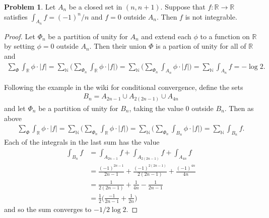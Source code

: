 \documentclass[20pt]{article}
\theoremstyle{plain}
\theoremstyle{definition}
\newtheorem*{problem}{Problem}
\newcommand{\reals}{\mathbb{R}}
\newcommand{\naturals}{\mathbb{N}}
\begin{document}
\begin{problem}{3.38}
  Let $A_n$ be a closed set in $(n, n+1)$. Suppose that $f: \reals \to \reals$
  satisfies $\int_{A_n}f = (-1)^n/n$ and $f=0$ outside $A_n.$ 
  Then $f$ is not integrable.
\end{problem}

\begin{proof}
  Let $\Phi_n$ be a partition of unity for $A_n$ and extend each 
  $\phi$ to a function on $\mathbb{R}$ by setting $\phi=0$ outside 
  $A_n$.
  Then their union $\Phi$ is a partion of unity for all of $\mathbb{R}$
  and 
  \begin{align}
    \sum_\Phi \int_\mathbb{R} \phi \cdot |f| = 
    \sum_\naturals \bigg( \sum_{\Phi_n} \int_\reals \phi \cdot |f| \bigg) = 
    \sum_\naturals \bigg( \sum_{\Phi_n} \int_{A_n} \phi \cdot |f| \bigg) = 
    \sum_\naturals \int_{A_n}f = -\log 2.
  \end{align}

  Following the example in the wiki for conditional convergence, 
  define the sets 
  \begin{align}
    B_n = A_{2n - 1} \cup A_{2(2n-1)} \cup A_{4n}
  \end{align}
  and let $\Phi_n$ be a partition of unity for $B_n$, taking the 
  value $0$ outside $B_n$.  Then as above
  \begin{align}
    \sum_\Phi \int_\reals \phi \cdot |f| = 
    \sum_\naturals \bigg(\sum_{\Phi_n} \int_\reals \phi \cdot |f| \bigg) = 
    \sum_\naturals \bigg(\sum_{\Phi_n} \int_{B_n} \phi \cdot |f| \bigg) = 
    \sum_\naturals \int_{B_n}f.
  \end{align} 
  Each of the integrals in the last sum has the value 
  \begin{align}
    \int_{B_n}f
    &= \int_{A_{2n-1}}f + \int_{A_{2(2n-1)}}f + \int_{A_{4n}}f \\
    &=  \frac{(-1)^{2n-1}}{2n-1} + 
        \frac{(-1)^{2(2n-1)}}{2(2n-1)} + 
        \frac{(-1)^{4n}}{4n} \\
    &=  \frac{1}{2(2n-1)} +
        \frac{1}{4n} -
        \frac{1}{2n-1} \\
    &= \frac{1}{2} \bigg(
     \frac{-1}{2n-1} + \frac{1}{2n} \bigg)
  \end{align}
  and so the sum converges to $-1/2 \log 2.$
\end{proof}
\end{document}
